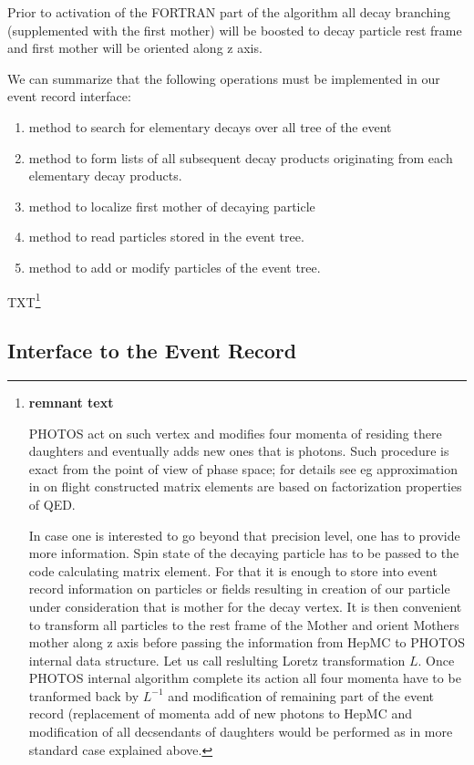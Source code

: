 \documentclass[]{Photos_interface_design}
\begin{document}
Prior to activation
of the FORTRAN part of the algorithm all decay branching 
(supplemented with the first 
mother) will be boosted to decay particle rest frame and first mother
will be oriented along z axis.

We can summarize that the following operations must be implemented
in our event record interface:
\begin{enumerate}
\item method to search for elementary decays over all tree of the event
\item method to form lists of all subsequent decay products originating from each elementary decay products.
\item method to localize first mother of decaying particle 
\item method to read  particles stored in the event tree.
\item method to add or modify particles of the event tree.
\end{enumerate}

TXT\footnote{ {\bf remnant text}  

PHOTOS act on such vertex and modifies four momenta of residing there daughters 
and eventually adds new ones that is photons. 
Such procedure is exact from the point of view of phase space; for details see eg  approximation in on flight constructed matrix elements are based
on factorization properties of QED. 

In case one is interested to go beyond that precision level, one has to  provide
more information. Spin state of the decaying particle has to be passed to the code calculating matrix element. For that it is enough to store into event record
information on particles or fields resulting in creation of
our particle under consideration that is mother for the decay vertex.
It is then convenient to transform all particles to the rest frame of the Mother
and orient Mothers mother along z axis before passing the information from HepMC to PHOTOS internal data structure. Let us call reslulting Loretz transformation $L$. Once PHOTOS internal algorithm complete
its action all four momenta have to be tranformed back by $L^{-1}$ and 
modification of remaining part of the event record (replacement of momenta
add of new photons to HepMC and modification of all decsendants of 
daughters would be performed as in more standard case explained above.
}

\subsection{Interface to the Event Record}
\end{document}
